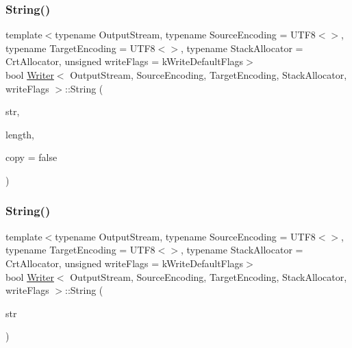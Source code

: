 \subsubsection{\texorpdfstring{String()}{String()}\hspace{0.1cm}{\footnotesize\ttfamily [1/2]}}
{\footnotesize\ttfamily template$<$typename Output\+Stream, typename Source\+Encoding = U\+T\+F8$<$$>$, typename Target\+Encoding = U\+T\+F8$<$$>$, typename Stack\+Allocator = Crt\+Allocator, unsigned write\+Flags = k\+Write\+Default\+Flags$>$ \\
bool \hyperlink{classWriter}{Writer}$<$ Output\+Stream, Source\+Encoding, Target\+Encoding, Stack\+Allocator, write\+Flags $>$\+::String (\begin{DoxyParamCaption}\item[{const \hyperlink{classWriter_ab08bff5fd2daec65f4a78779ca3d2139}{Ch} $\ast$}]{str,  }\item[{\hyperlink{rapidjson_8h_a5ed6e6e67250fadbd041127e6386dcb5}{Size\+Type}}]{length,  }\item[{bool}]{copy = {\ttfamily false} }\end{DoxyParamCaption})\hspace{0.3cm}{\ttfamily [inline]}}

\mbox{\label{classWriter_a2a2c6f51644b2013471aec4dac0d7466}} 
\subsubsection{\texorpdfstring{String()}{String()}\hspace{0.1cm}{\footnotesize\ttfamily [2/2]}}
{\footnotesize\ttfamily template$<$typename Output\+Stream, typename Source\+Encoding = U\+T\+F8$<$$>$, typename Target\+Encoding = U\+T\+F8$<$$>$, typename Stack\+Allocator = Crt\+Allocator, unsigned write\+Flags = k\+Write\+Default\+Flags$>$ \\
bool \hyperlink{classWriter}{Writer}$<$ Output\+Stream, Source\+Encoding, Target\+Encoding, Stack\+Allocator, write\+Flags $>$\+::String (\begin{DoxyParamCaption}\item[{const \hyperlink{classWriter_ab08bff5fd2daec65f4a78779ca3d2139}{Ch} $\ast$const \&}]{str }\end{DoxyParamCaption})\hspace{0.3cm}{\ttfamily [inline]}}



